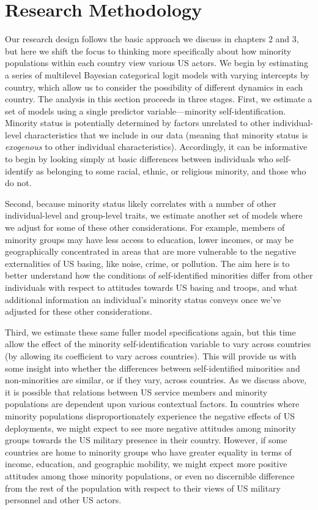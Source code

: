 \section*{Research Methodology}
Our research design follows the basic approach we discuss in chapters 2 and 3, but here we shift the focus to thinking more specifically about how minority populations within each country view various US actors. We begin by estimating a series of multilevel Bayesian categorical logit models with varying intercepts by country, which allow us to consider the possibility of different dynamics in each country. The analysis in this section proceeds in three stages. First, we estimate a set of models using a single predictor variable---minority self-identification. Minority status is potentially determined by factors unrelated to other individual-level characteristics that we include in our data (meaning that minority status is \textit{exogenous} to other individual characteristics). Accordingly, it can be informative to begin by looking simply at basic differences between individuals who self-identify as belonging to some racial, ethnic, or religious minority, and those who do not. 

Second, because minority status likely correlates with a number of other individual-level and group-level traits, we estimate another set of models where we adjust for some of these other considerations. For example, members of minority groups may have less access to education, lower incomes, or may be geographically concentrated in areas that are more vulnerable to the negative externalities of US basing, like noise, crime, or pollution. The aim here is to better understand how the conditions of self-identified minorities differ from other individuals with respect to attitudes towards US basing and troops, and what additional information an individual's minority status conveys once we've adjusted for these other considerations. 

Third, we estimate these same fuller model specifications again, but this time allow the effect of the minority self-identification variable to vary across countries (by allowing its coefficient to vary across countries). This will provide us with some insight into whether the differences between self-identified minorities and non-minorities are similar, or if they vary, across countries. As we discuss above, it is possible that relations between US service members and minority populations are dependent upon various contextual factors. In countries where minority populations disproportionately experience the negative effects of US deployments, we might expect to see more negative attitudes among minority groups towards the US military presence in their country. However, if some countries are home to minority groups who have greater equality in terms of income, education, and geographic mobility, we might expect more positive attitudes among those minority populations, or even no discernible difference from the rest of the population with respect to their views of US military personnel and other US actors. 

